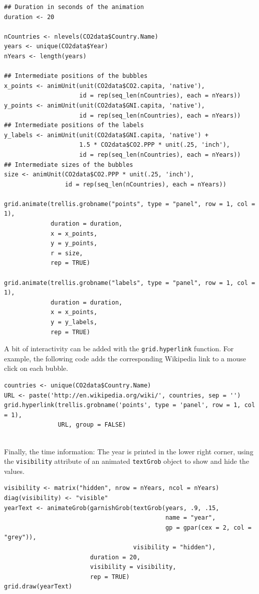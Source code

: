 \lstset{language=r,label= ,caption= ,captionpos=b,numbers=none}
\begin{lstlisting}
## Duration in seconds of the animation
duration <- 20
  
nCountries <- nlevels(CO2data$Country.Name)
years <- unique(CO2data$Year)
nYears <- length(years)

## Intermediate positions of the bubbles
x_points <- animUnit(unit(CO2data$CO2.capita, 'native'),
                     id = rep(seq_len(nCountries), each = nYears))
y_points <- animUnit(unit(CO2data$GNI.capita, 'native'),
                     id = rep(seq_len(nCountries), each = nYears))
## Intermediate positions of the labels
y_labels <- animUnit(unit(CO2data$GNI.capita, 'native') +
                     1.5 * CO2data$CO2.PPP * unit(.25, 'inch'),
                     id = rep(seq_len(nCountries), each = nYears))
## Intermediate sizes of the bubbles
size <- animUnit(CO2data$CO2.PPP * unit(.25, 'inch'),
                 id = rep(seq_len(nCountries), each = nYears))

grid.animate(trellis.grobname("points", type = "panel", row = 1, col = 1),
             duration = duration,
             x = x_points,
             y = y_points,
             r = size,
             rep = TRUE)

grid.animate(trellis.grobname("labels", type = "panel", row = 1, col = 1),
             duration = duration,
             x = x_points,
             y = y_labels,
             rep = TRUE)

\end{lstlisting}

A bit of interactivity can be added with the \texttt{grid.hyperlink}
function. For example, the following code adds the corresponding
Wikipedia link to a mouse click on each bubble.


\lstset{language=r,label= ,caption= ,captionpos=b,numbers=none}
\begin{lstlisting}
countries <- unique(CO2data$Country.Name)
URL <- paste('http://en.wikipedia.org/wiki/', countries, sep = '')
grid.hyperlink(trellis.grobname('points', type = 'panel', row = 1, col = 1),
               URL, group = FALSE)
  
\end{lstlisting}

Finally, the time information: The year is printed in the lower
right corner, using the \texttt{visibility} attribute of an animated
\texttt{textGrob} object to show and hide the values.
\lstset{language=r,label= ,caption= ,captionpos=b,numbers=none}
\begin{lstlisting}
visibility <- matrix("hidden", nrow = nYears, ncol = nYears)
diag(visibility) <- "visible"
yearText <- animateGrob(garnishGrob(textGrob(years, .9, .15,
                                             name = "year",
                                             gp = gpar(cex = 2, col = "grey")),
                                    visibility = "hidden"),
                        duration = 20,
                        visibility = visibility,
                        rep = TRUE)
grid.draw(yearText)
\end{lstlisting}

